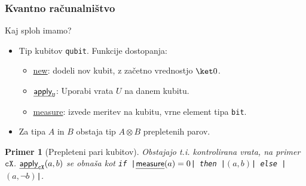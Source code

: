 \documentclass[slovene]{beamer}
\newcommand{\ul}[1]{\uline{#1}}
\newtheorem{primer}{Primer}
\newcommand{\g}[1]{\mathtt{#1}}
\newcommand{\ctl}[1]{\g{c#1}}
\newcommand{\eff}[1]{\textnormal{\sffamily\ul{#1}}}
\begin{document}
\begin{frame}[fragile]
    \frametitle{Kvantno računalništvo}

    Kaj sploh imamo?
    \begin{itemize}
        \item Tip kubitov \texttt{qubit}. Funkcije dostopanja:
        \begin{itemize}
            \item \eff{new}: dodeli nov kubit, z začetno vrednostjo \(\ket 0\).
            \item \(\eff{apply}_{\g U}\): Uporabi vrata \(U\) na danem kubitu.
            \item \eff{measure}: izvede meritev na kubitu, vrne element tipa \texttt{bit}.
        \end{itemize}
        \pause
        \item Za tipa \(A\) in \(B\) obstaja tip \(A\otimes B\) prepletenih parov.
    \end{itemize}
    \begin{primer}[Prepleteni pari kubitov]
        Obstajajo t.i. kontrolirana vrata, na primer \(\ctl X\).
        \(\eff{apply}_{\ctl X}(a, b)\) se obnaša kot
        \texttt{if |\(\eff{measure}(a) = 0\)| then |$(a, b)$| else |$(a, ¬b)$|}.
    \end{primer}
\end{frame}
\end{document}

